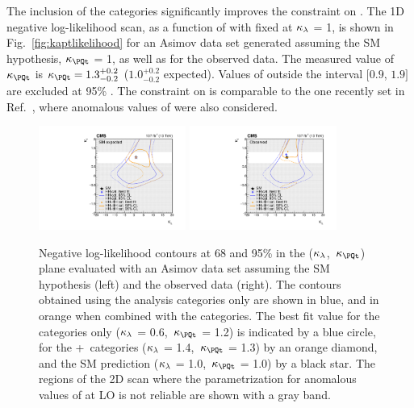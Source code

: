 \documentclass[11pt,twoside,a4paper,cmspaper,final,collab]{cms-tdr}
\begin{document}
The inclusion of the \ttH categories significantly improves the constraint on \kapt. The 1D negative log-likelihood scan, as a function of \kapt with \kapl fixed at $\kappa_{\lambda}$ = 1, is shown in Fig.~\ref{fig:kaptlikelihood} for an Asimov data set generated assuming the SM hypothesis, $\kapt$ = 1, as well as for the observed data. The measured value of $\kapt$ is $\kapt = 1.3^{+0.2}_{-0.2}$ ($1.0^{+0.2}_{-0.2}$ expected).
Values of \kapt outside the interval $[0.9$, $1.9]$ are excluded at 95\% \CL. The constraint on \kapt is comparable to the one recently set in Ref.~\cite{Sirunyan:2020icl}, where anomalous values of \conev were also considered. 

\begin{figure}[!htb]
  \centering
\includegraphics[width=0.43\textwidth]{Figure_012-a.pdf} 
\includegraphics[width=0.43\textwidth]{Figure_012-b.pdf} 
  \caption{Negative log-likelihood contours at 68 and 95\% \CL in the ($\kappa_{\lambda}$,~$\kapt$) plane evaluated with an Asimov data set assuming the SM hypothesis (left) and the observed data (right). The contours obtained using the \HH analysis categories only are shown in blue, and in orange when combined with the \ttH categories. The best fit value for the \HH categories only ($\kappa_{\lambda}$ = 0.6,~$\kapt$ = 1.2) is indicated by a blue circle, for the \HH+~\ttH categories ($\kappa_{\lambda}$ = 1.4,~$\kapt$ = 1.3) by an orange diamond, and the SM prediction ($\kappa_{\lambda}$ = 1.0,~$\kapt$ = 1.0) by a black star. The regions of the 2D scan where the \kapt parametrization for anomalous values of \kapl at LO is not reliable are shown with a gray band.}
  \label{fig:klkaptlikelihood_tthcombination}
\end{figure}
\end{document}

